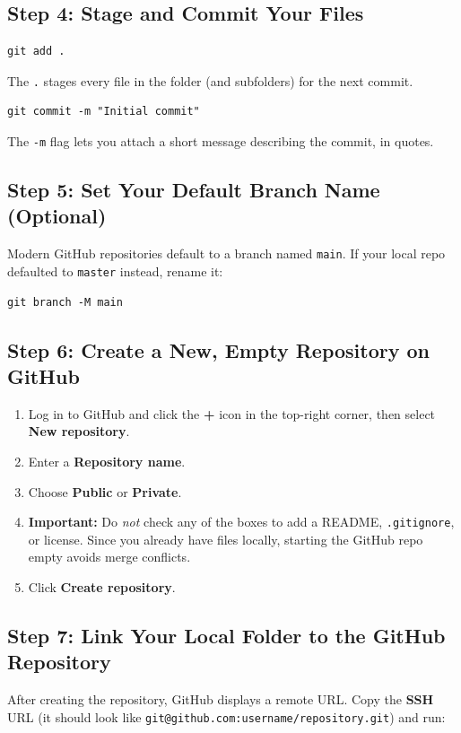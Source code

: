 \documentclass[main.tex]{subfiles}
\begin{document}
\subsection{Step 4: Stage and Commit Your Files}
\begin{lstlisting}
git add .
\end{lstlisting}

The \texttt{.} stages every file in the folder (and subfolders)
for the next commit.

\begin{lstlisting}
git commit -m "Initial commit"
\end{lstlisting}

The \texttt{-m} flag lets you attach a short message describing
the commit, in quotes.

\subsection{Step 5: Set Your Default Branch Name (Optional)}
Modern GitHub repositories default to a branch named
\texttt{main}. If your local repo defaulted to \texttt{master}
instead, rename it:

\begin{lstlisting}
git branch -M main
\end{lstlisting}

\subsection{Step 6: Create a New, Empty Repository on GitHub}
\begin{enumerate}[leftmargin=*]
    \item Log in to GitHub and click the \textbf{+} icon in the
    top-right corner, then select \textbf{New repository}.
    \item Enter a \textbf{Repository name}.
    \item Choose \textbf{Public} or \textbf{Private}.
    \item \textbf{Important:} Do \emph{not} check any of the boxes
    to add a README, \texttt{.gitignore}, or license. Since you
    already have files locally, starting the GitHub repo empty
    avoids merge conflicts.
    \item Click \textbf{Create repository}.
\end{enumerate}

\subsection{Step 7: Link Your Local Folder to the GitHub Repository}
After creating the repository, GitHub displays a remote URL.
Copy the \textbf{SSH} URL (it should look like
\texttt{git@github.com:username/repository.git}) and run:
\end{document}
